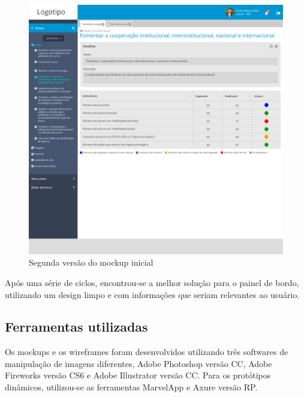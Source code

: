 \begin{figure}[H]
\centering
\includegraphics[width=1\textwidth]{images/dashboard0_1.png}
\caption{Segunda versão do mockup inicial}
\label{fig:dashboard0_1}
\end{figure}



Após uma série de ciclos, encontrou-se a melhor solução para o painel de bordo, utilizando um design limpo e com informações que seriam relevantes ao usuário.





\subsection{Ferramentas utilizadas}
Os mockups e os wireframes foram desenvolvidos utilizando três softwares de manipulação de imagens diferentes, Adobe Photoshop versão CC, Adobe Fireworks versão CS6 e Adobe Illustrator versão CC. Para os protótipos dinâmicos, utilizou-se as ferramentas    MarvelApp e Axure versão RP.

